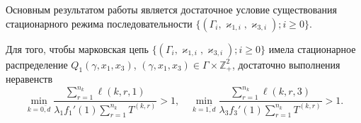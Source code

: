 \documentclass[a4paper,12pt,russian]{extarticle}
\begin{document}
Основным результатом работы является достаточное условие существования стационарного режима последовательности $\{(\Gamma_i, \varkappa_{1,i},\varkappa_{3,i}); i \geqslant 0\}$.
\begin{theorem}
Для того, чтобы марковская цепь $\{(\Gamma_i, \varkappa_{1,i},\varkappa_{3,i}); i \geqslant 0\}$ имела стационарное распределение $Q_1(\gamma,x_1,x_3)$, $(\gamma,x_1,x_3)\in \Gamma \times {\mathbb Z}^2_+$, достаточно выполнения неравенств
\begin{equation}
\min_{k=\overline{0,d}} { \frac{\sum_{r = 1}^{n_k} \ell(k,r,1) }{\lambda_1 f_1'(1) \sum_{r=1}^{n_k} T^{(k,r)} }}>1, \quad 
\min_{k=\overline{1,d}} { \frac{\sum_{r = 1}^{n_k} \ell(k,r,3) }{\lambda_3 f_3'(1) \sum_{r=1}^{n_k} T^{(k,r)} }}>1.
\label{sufficient:double}
\end{equation}
\label{sufficient:double:theorem}
\end{theorem}
\end{document}

